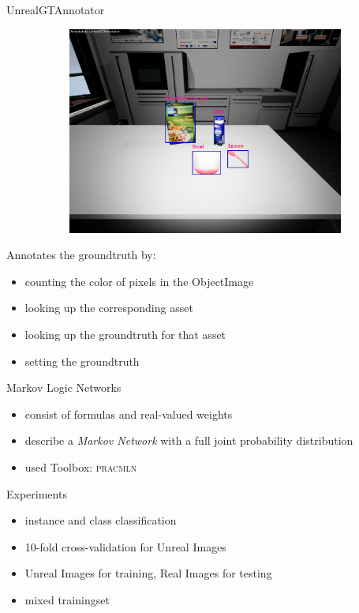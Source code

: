 \documentclass[]{beamer}
\begin{document}
\begin{frame}{UnrealGTAnnotator}
\begin{figure}
\begin{subfigure}[b]{0.3\textwidth}
		\includegraphics[scale=.08]{img/gt.png}	
	\end{subfigure}
\end{figure}
Annotates the groundtruth by:
	\begin{itemize}
		\item counting the color of pixels in the ObjectImage
		\item looking up the corresponding asset 
		\item looking up the groundtruth for that asset
		\item setting the groundtruth 
	\end{itemize}
\end{frame}


\begin{frame}{Markov Logic Networks}
	\begin{itemize}
		\item<1-> consist of formulas and real-valued weights
		\item<2-> describe a \textit{Markov Network} with a full joint probability distribution
		\item<2-> used Toolbox: \textsc{pracmln}
	\end{itemize}
\end{frame}


\begin{frame}{Experiments}
	\begin{itemize}
		\item instance and class classification
		\item 10-fold cross-validation for Unreal Images
		\item Unreal Images for training, Real Images for testing
		\item mixed trainingset
	\end{itemize}
\end{frame}
\end{document}
